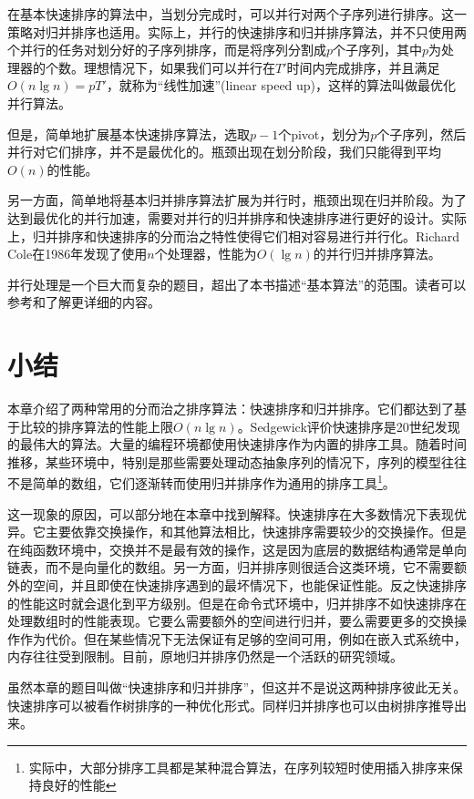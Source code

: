 \documentclass[b5paper]{ctexart}
\begin{document}
在基本快速排序的算法中，当划分完成时，可以并行对两个子序列进行排序。这一策略对归并排序也适用。实际上，并行的快速排序和归并排序算法，并不只使用两个并行的任务对划分好的子序列排序，而是将序列分割成$p$个子序列，其中$p$为处理器的个数。理想情况下，如果我们可以并行在$T'$时间内完成排序，并且满足$O(n \lg n) = p T'$，就称为“线性加速”(linear speed up)，这样的算法叫做最优化并行算法。

但是，简单地扩展基本快速排序算法，选取$p-1$个pivot，划分为$p$个子序列，然后并行对它们排序，并不是最优化的。瓶颈出现在划分阶段，我们只能得到平均$O(n)$的性能。

另一方面，简单地将基本归并排序算法扩展为并行时，瓶颈出现在归并阶段。为了达到最优化的并行加速，需要对并行的归并排序和快速排序进行更好的设计。实际上，归并排序和快速排序的分而治之特性使得它们相对容易进行并行化。Richard Cole在1986年发现了使用$n$个处理器，性能为$O(\lg n)$的并行归并排序算法\cite{para-msort}。

并行处理是一个巨大而复杂的题目，超出了本书描述“基本算法”的范围。读者可以参考\cite{para-msort}和\cite{para-qsort}了解更详细的内容。

\section{小结}

本章介绍了两种常用的分而治之排序算法：快速排序和归并排序。它们都达到了基于比较的排序算法的性能上限$O(n \lg n)$。Sedgewick评价快速排序是20世纪发现的最伟大的算法。大量的编程环境都使用快速排序作为内置的排序工具。随着时间推移，某些环境中，特别是那些需要处理动态抽象序列的情况下，序列的模型往往不是简单的数组，它们逐渐转而使用归并排序作为通用的排序工具\footnote{实际中，大部分排序工具都是某种混合算法，在序列较短时使用插入排序来保持良好的性能}。

这一现象的原因，可以部分地在本章中找到解释。快速排序在大多数情况下表现优异。它主要依靠交换操作，和其他算法相比，快速排序需要较少的交换操作。但是在纯函数环境中，交换并不是最有效的操作，这是因为底层的数据结构通常是单向链表，而不是向量化的数组。另一方面，归并排序则很适合这类环境，它不需要额外的空间，并且即使在快速排序遇到的最坏情况下，也能保证性能。反之快速排序的性能这时就会退化到平方级别。但是在命令式环境中，归并排序不如快速排序在处理数组时的性能表现。它要么需要额外的空间进行归并，要么需要更多的交换操作作为代价。但在某些情况下无法保证有足够的空间可用，例如在嵌入式系统中，内存往往受到限制。目前，原地归并排序仍然是一个活跃的研究领域。

虽然本章的题目叫做“快速排序和归并排序”，但这并不是说这两种排序彼此无关。快速排序可以被看作树排序的一种优化形式。同样归并排序也可以由树排序推导出来\cite{sort-deriving}。
\end{document}
